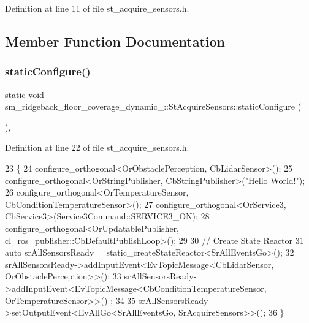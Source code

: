 Definition at line 11 of file st\+\_\+acquire\+\_\+sensors.\+h.



\subsection{Member Function Documentation}
\mbox{\label{structsm__ridgeback__floor__coverage__dynamic__1_1_1StAcquireSensors_a013cc09c170d2a22d3946ed427dd85dc}} 
\subsubsection{\texorpdfstring{static\+Configure()}{staticConfigure()}}
{\footnotesize\ttfamily static void sm\+\_\+ridgeback\+\_\+floor\+\_\+coverage\+\_\+dynamic\+\_\+::\+St\+Acquire\+Sensors\+::static\+Configure (\begin{DoxyParamCaption}{ }\end{DoxyParamCaption})\hspace{0.3cm}{\ttfamily [inline]}, {\ttfamily [static]}}



Definition at line 22 of file st\+\_\+acquire\+\_\+sensors.\+h.


\begin{DoxyCode}
23    \{
24       configure\_orthogonal<OrObstaclePerception, CbLidarSensor>();
25       configure\_orthogonal<OrStringPublisher, CbStringPublisher>(\textcolor{stringliteral}{"Hello World!"});
26       configure\_orthogonal<OrTemperatureSensor, CbConditionTemperatureSensor>();
27       configure\_orthogonal<OrService3, CbService3>(Service3Command::SERVICE3\_ON);
28       configure\_orthogonal<OrUpdatablePublisher, cl\_ros\_publisher::CbDefaultPublishLoop>();
29 
30       \textcolor{comment}{// Create State Reactor}
31       \textcolor{keyword}{auto} srAllSensorsReady = static\_createStateReactor<SrAllEventsGo>();
32       srAllSensorsReady->addInputEvent<EvTopicMessage<CbLidarSensor, OrObstaclePerception>>();
33       srAllSensorsReady->addInputEvent<EvTopicMessage<CbConditionTemperatureSensor, OrTemperatureSensor>>()
      ;
34 
35       srAllSensorsReady->setOutputEvent<EvAllGo<SrAllEventsGo, SrAcquireSensors>>();
36    \}
\end{DoxyCode}


